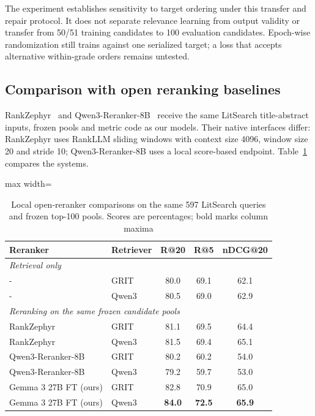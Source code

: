 \documentclass[pdflatex,sn-basic,Numbered]{sn-jnl}%
\theoremstyle{thmstyleone}%
\theoremstyle{thmstyletwo}%
\theoremstyle{thmstylethree}%
\begin{document}
The experiment establishes sensitivity to target ordering under this transfer
and repair protocol. It does not separate relevance learning from output
validity or transfer from 50/51 training candidates to 100 evaluation candidates.
Epoch-wise randomization still trains against one serialized target; a loss
that accepts alternative within-grade orders remains untested.

\subsection{Comparison with open reranking baselines}
RankZephyr~\cite{Pradeep} and Qwen3-Reranker-8B~\cite{Zhang} receive the same
LitSearch title-abstract inputs, frozen pools and metric code as our models.
Their native interfaces differ: RankZephyr uses RankLLM sliding windows with
context size 4096, window size 20 and stride 10; Qwen3-Reranker-8B uses a local
score-based endpoint. Table~\ref{tab:open-reranker-baselines} compares the systems.

\begin{table}[htbp]


\centering
\footnotesize
\setlength{\tabcolsep}{4pt}
\begin{adjustbox}{max width=\linewidth}
\begin{tabular}{l l c c c}
\hline
Reranker & Retriever & R@20 & R@5 & nDCG@20 \\
\hline
\multicolumn{5}{l}{\textit{Retrieval only}} \\
- & GRIT  & 80.0 & 69.1 & 62.1 \\
- & Qwen3 & 80.5 & 69.0 & 62.9 \\
\hline
\multicolumn{5}{l}{\textit{Reranking on the same frozen candidate pools}} \\
RankZephyr & GRIT  & 81.1 & 69.5 & 64.4 \\
RankZephyr & Qwen3 & 81.5 & 69.4 & 65.1 \\
Qwen3-Reranker-8B & GRIT  & 80.2 & 60.2 & 54.0 \\
Qwen3-Reranker-8B & Qwen3 & 79.2 & 59.7 & 53.0 \\
Gemma 3 27B FT (ours) & GRIT  & 82.8 & 70.9 & 65.0 \\
Gemma 3 27B FT (ours) & Qwen3 & \textbf{84.0} & \textbf{72.5} & \textbf{65.9} \\
\hline
\end{tabular}
\end{adjustbox}


\caption{Local open-reranker comparisons on the same 597 LitSearch queries and frozen top-100 pools. Scores are percentages; bold marks column maxima}
\label{tab:open-reranker-baselines}
\end{table}
\end{document}

